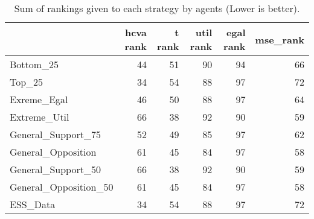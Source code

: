 \begin{table}
\caption{Sum of rankings given to each strategy by agents (Lower is better).}
\begin{tabular}{lrrrrr}
\toprule
 & hcva rank & t rank & util rank & egal rank & mse_rank \\
\midrule
Bottom_25 & 44 & 51 & 90 & 94 & 66 \\
Top_25 & 34 & 54 & 88 & 97 & 72 \\
Exreme_Egal & 46 & 50 & 88 & 97 & 64 \\
Extreme_Util & 66 & 38 & 92 & 90 & 59 \\
General_Support_75 & 52 & 49 & 85 & 97 & 62 \\
General_Opposition & 61 & 45 & 84 & 97 & 58 \\
General_Support_50 & 66 & 38 & 92 & 90 & 59 \\
General_Opposition_50 & 61 & 45 & 84 & 97 & 58 \\
ESS_Data & 34 & 54 & 88 & 97 & 72 \\
\bottomrule
\end{tabular}
\end{table}
